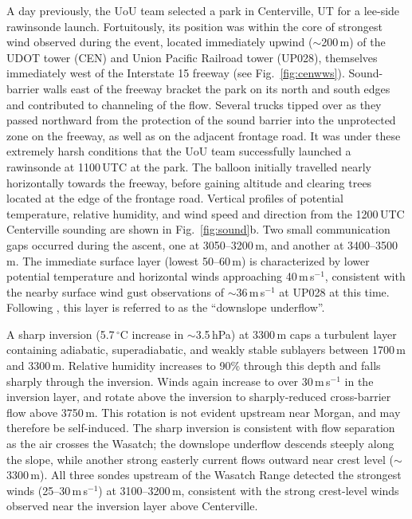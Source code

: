\documentclass[pdftex,12pt]{article}
\def\mps{m\,s$^{-1}$}
\def\degC{$^{\circ}$C} %
\def\around{$\sim$}
\begin{document}
A day previously, the UoU team selected a park in Centerville, UT for a lee-side rawinsonde launch. Fortuitously, its position was within the core of strongest wind observed during the event, located immediately upwind (\around 200\,m) of the UDOT tower (CEN) and Union Pacific Railroad tower (UP028), themselves immediately west of the Interstate 15 freeway (see Fig.~\ref{fig:cenwws}). Sound-barrier walls east of the freeway bracket the park on its north and south edges and contributed to channeling of the flow. Several trucks tipped over as they passed northward from the protection of the sound barrier into the unprotected zone on the freeway, as well as on the adjacent frontage road. It was under these extremely harsh conditions that the UoU team successfully launched a rawinsonde at 1100\,UTC at the park. The balloon initially travelled nearly horizontally towards the freeway, before gaining altitude and clearing trees located at the edge of the frontage road. Vertical profiles of potential temperature, relative humidity, and wind speed and direction from the 1200\,UTC Centerville sounding are shown in Fig.~\ref{fig:sound}b. Two small communication gaps occurred during the ascent, one at 3050--3200\,m, and another at 3400--3500\,m. The immediate surface layer (lowest 50--60\,m) is characterized by lower potential temperature and horizontal winds approaching 40\,\mps, consistent with the nearby surface wind gust observations of \around 36\,\mps{} at UP028 at this time. Following \citet{Armi2011}, this layer is referred to as the ``downslope underflow''.

A sharp inversion (5.7\,\degC{} increase in \around 3.5\,hPa) at 3300\,m caps a turbulent layer containing adiabatic, superadiabatic, and weakly stable sublayers between 1700\,m and 3300\,m. Relative humidity increases to 90\% through this depth and falls sharply through the inversion. Winds again increase to over 30\,\mps{} in the inversion layer, and rotate above the inversion to sharply-reduced cross-barrier flow above 3750\,m. This rotation is not evident upstream near Morgan, and may therefore be self-induced. The sharp inversion is consistent with flow separation as the air crosses the Wasatch; the downslope underflow descends steeply along the slope, while another strong easterly current flows outward near crest level (\around 3300\,m). All three sondes upstream of the Wasatch Range detected the strongest winds (25--30\,\mps) at 3100--3200\,m, consistent with the strong crest-level winds observed near the inversion layer above Centerville.
\end{document}
